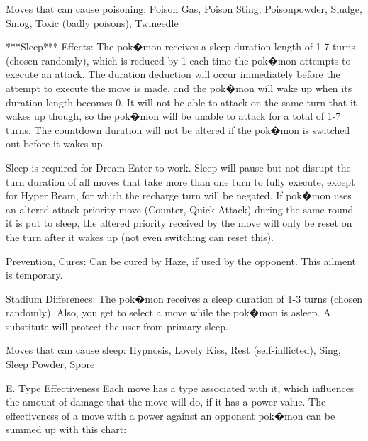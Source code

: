\documentclass[reprint, aps, prl, paper=A4]{revtex4-1}
\begin{document}
Moves that can cause poisoning: Poison Gas, Poison Sting, Poisonpowder, Sludge, Smog,
          Toxic (badly poisons), Twineedle


***Sleep***
Effects: The pok�mon receives a sleep duration length of 1-7 turns (chosen randomly), which is
reduced by 1 each time the pok�mon attempts to execute an attack. The duration deduction will
occur immediately before the attempt to execute the move is made, and the pok�mon will wake up
when its duration length becomes 0. It will not be able to attack on the same turn that it
wakes up though, so the pok�mon will be unable to attack for a total of 1-7 turns. The
countdown duration will not be altered if the pok�mon is switched out before it wakes up.

Sleep is required for Dream Eater to work. Sleep will pause but not disrupt the turn duration
of all moves that take more than one turn to fully execute, except for Hyper Beam, for which
the recharge turn will be negated. If pok�mon uses an altered attack priority move (Counter,
Quick Attack) during the same round it is put to sleep, the altered priority received by the
move will only be reset on the turn after it wakes up (not even switching can reset this).

Prevention, Cures: Can be cured by Haze, if used by the opponent. This ailment is temporary.

Stadium Differenecs: The pok�mon receives a sleep duration of 1-3 turns (chosen randomly).
Also, you get to select a move while the pok�mon is asleep. A substitute will protect the user
from primary sleep.

Moves that can cause sleep: Hypnosis, Lovely Kiss, Rest (self-inflicted), Sing, Sleep Powder,
          Spore



E. Type Effectiveness
Each move has a type associated with it, which influences the amount of damage that the move
will do, if it has a power value. The effectiveness of a move with a power against an opponent
pok�mon can be summed up with this chart:
\end{document}
